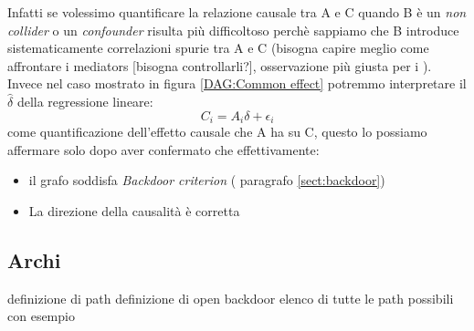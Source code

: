 Infatti se volessimo quantificare la relazione causale tra A e C quando B è un \textit{non collider} o  un \textit{confounder} risulta più difficoltoso perchè sappiamo che B introduce  sistematicamente correlazioni spurie tra A e C (bisogna capire meglio come affrontare i mediators [bisogna controllarli?], osservazione più giusta per i ). Invece nel caso mostrato in figura \ref{DAG:Common effect} potremmo interpretare il $\hat{\delta}$ della regressione lineare:
\begin{equation}
C_i= A_i\delta + \epsilon_i
\end{equation}
come quantificazione dell'effetto causale che A ha su C, questo lo possiamo affermare solo dopo aver confermato che effettivamente:
\begin{itemize}
\item il grafo soddisfa \textit{Backdoor criterion} ( paragrafo \ref{sect:backdoor})
\item La direzione della causalità è corretta
\end{itemize}

\subsection{Archi}
definizione di path
definizione di open backdoor 
elenco di tutte le path possibili  con esempio




%

